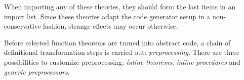 \begin{isabellebody}
\begin{isamarkuptext}
  \begin{warn}
    When importing any of these theories, they should form the last
    items in an import list.  Since these theories adapt the
    code generator setup in a non-conservative fashion,
    strange effects may occur otherwise.
  \end{warn}%
\end{isamarkuptext}%
\isamarkuptrue%
%
\isamarkuptrue%
%
\begin{isamarkuptext}%
Before selected function theorems are turned into abstract
  code, a chain of definitional transformation steps is carried
  out: \emph{preprocessing}. There are three possibilities
  to customize preprocessing: \emph{inline theorems},
  \emph{inline procedures} and \emph{generic preprocessors}.


\end{isamarkuptext}
\end{isabellebody}
